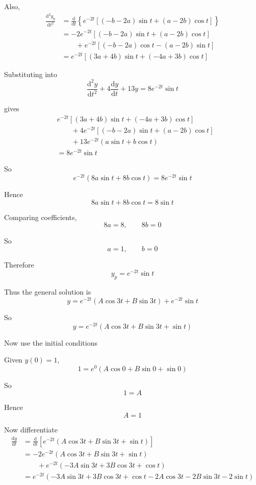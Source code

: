 \documentclass[leqno]{article}
\begin{document}
\begin{enumerate}[
  label=\textbf{\arabic*.},
  leftmargin=*,
  topsep=0pt,
  partopsep=0pt,
  parsep=0pt
]
\begin{tcolorbox}[colback=white, colframe=scarlet, title={\textbf{Solution}}, breakable, grow to left by=6mm, grow to right by=10mm]
Also,
\begin{align*}
\frac{\mathrm{d}^2y_p}{\mathrm{d}t^2}
&= \frac{\mathrm{d}}{\mathrm{d}t}\left\{e^{-2t}\left[(-b-2a)\sin t+(a-2b)\cos t\right]\right\} \\
&= -2e^{-2t}\left[(-b-2a)\sin t+(a-2b)\cos t\right] \\
&\qquad +e^{-2t}\left[(-b-2a)\cos t-(a-2b)\sin t\right] \\
&= e^{-2t}\left[(3a+4b)\sin t+(-4a+3b)\cos t\right]
\end{align*}

Substituting into
\[
\frac{\mathrm{d}^2 y}{\mathrm{d}t^2}+4\frac{\mathrm{d}y}{\mathrm{d}t}+13y=8e^{-2t}\sin t
\]

gives
\begin{align*}
& e^{-2t}\left[(3a+4b)\sin t+(-4a+3b)\cos t\right] \\
& \qquad +4e^{-2t}\left[(-b-2a)\sin t+(a-2b)\cos t\right] \\
& \qquad +13e^{-2t}\left(a\sin t+b\cos t\right) \\
&= 8e^{-2t}\sin t
\end{align*}

So
\[
e^{-2t}\left(8a\sin t+8b\cos t\right)=8e^{-2t}\sin t
\]

Hence
\[
8a\sin t+8b\cos t=8\sin t
\]

Comparing coefficients,
\[
8a=8, \qquad 8b=0
\]

So
\[
a=1, \qquad b=0
\]

Therefore
\[
y_p=e^{-2t}\sin t
\]

Thus the general solution is
\[
y=e^{-2t}\left(A\cos 3t+B\sin 3t\right)+e^{-2t}\sin t
\]

So
\[
y=e^{-2t}\left(A\cos 3t+B\sin 3t+\sin t\right)
\]

Now use the initial conditions

Given $y(0)=1$,
\[
1=e^{0}\left(A\cos 0+B\sin 0+\sin 0\right)
\]

So
\[
1=A
\]

Hence
\[
A=1
\]

Now differentiate
\begin{align*}
\frac{\mathrm{d}y}{\mathrm{d}t}
&= \frac{\mathrm{d}}{\mathrm{d}t}\left[e^{-2t}\left(A\cos 3t+B\sin 3t+\sin t\right)\right] \\
&= -2e^{-2t}\left(A\cos 3t+B\sin 3t+\sin t\right) \\
&\qquad +e^{-2t}\left(-3A\sin 3t+3B\cos 3t+\cos t\right) \\
&= e^{-2t}\left(-3A\sin 3t+3B\cos 3t+\cos t-2A\cos 3t-2B\sin 3t-2\sin t\right)
\end{align*}


\end{tcolorbox}
\end{enumerate}
\end{document}
